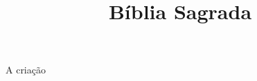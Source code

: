 \documentclass[10pt,a4paper]{book}
\title{Bíblia Sagrada}
\begin{document}
	
	\begin{multicol}{2}
		\caption{A criação}
		\lipsum
	\end{multicol}
\end{document}
